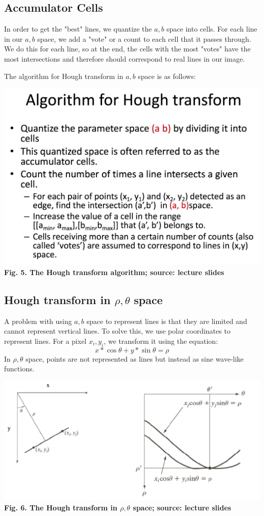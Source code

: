 \documentclass{article}
\begin{document}
\subsection{Accumulator Cells}
In order to get the "best" lines, we quantize the $a,b$ space into cells. For each line in our $a,b$ space, we add a "vote" or a count to each cell that it passes through. We do this for each line, so at the end, the cells with the most "votes" have the most intersections and therefore should correspond to real lines in our image.

The algorithm for Hough transform in $a,b$ space is as follows:

\includegraphics[width=\textwidth]{hough_transform3.png}
\textbf{Fig. 5. The Hough transform algorithm; source: lecture slides}

\subsection{Hough transform in $\rho, \theta$ space}
A problem with using $a,b$ space to represent lines is that they are limited and cannot represent vertical lines.
To solve this, we use polar coordinates to represent lines. For a pixel $x_i, y_i$, we transform it using the equation:
$$ x*\cos\theta + y*\sin\theta = \rho$$
In $\rho, \theta$ space, points are not represented as lines but instead as sine wave-like functions.

\includegraphics[width=\textwidth]{hough_transform4.png}
\textbf{Fig. 6. The Hough transform in $\rho, \theta$ space; source: lecture slides}
\end{document}
